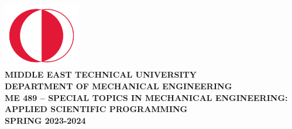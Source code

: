 \begin{titlepage}
   \begin{center}
       \includegraphics[width=0.25\textwidth]{figures/metu.png}\\
       \vspace*{1cm}
       \Large
       \textbf{MIDDLE EAST TECHNICAL UNIVERSITY}\\
       \vspace{0.05cm}
       \textbf{DEPARTMENT OF MECHANICAL ENGINEERING}\\
       \vspace{1.2cm}
       \textbf{ME 489 – SPECIAL TOPICS IN MECHANICAL ENGINEERING: APPLIED SCIENTIFIC PROGRAMMING}\\
       \vspace{.75cm}
       \textbf{SPRING 2023-2024}\\
       \vspace{3cm}
       \\
       \vspace{0.5cm}
       \\
       \vspace{2cm}

       \vfill
       
       \small
            
       \vspace{0cm}

            
   \end{center}
\end{titlepage}